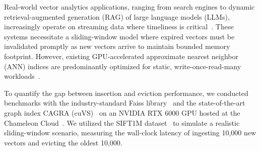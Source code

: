 \documentclass[sigconf,nonacm]{acmart}
\theoremstyle{plain}
\theoremstyle{definition}
\theoremstyle{remark}
\begin{document}

Real-world vector analytics applications, ranging from search engines to dynamic retrieval-augmented generation (RAG) of large language models (LLMs), increasingly operate on streaming data where timeliness is critical~\cite{zli_sigmod26,jmohoney_osdi25}. These systems necessitate a sliding-window model where expired vectors must be invalidated promptly as new vectors arrive to maintain bounded memory footprint. However, existing GPU-accelerated approximate nearest neighbor (ANN) indices are predominantly optimized for static, write-once-read-many workloads~\cite{zzhang_nsdi24,vectraflow}.

To quantify the gap between insertion and eviction performance, we conducted benchmarks with the industry-standard Faiss library~\cite{johnson2019billion} and the state-of-the-art graph index CAGRA (cuVS)~\cite{10597683} on an NVIDIA RTX 6000 GPU hosted at the Chameleon Cloud~\cite{keahey2020lessons}. We utilized the SIFT1M dataset~\cite{jegou2011product} to simulate a realistic sliding-window scenario, measuring the wall-clock latency of ingesting 10,000 new vectors and evicting the oldest 10,000.
\end{document}
